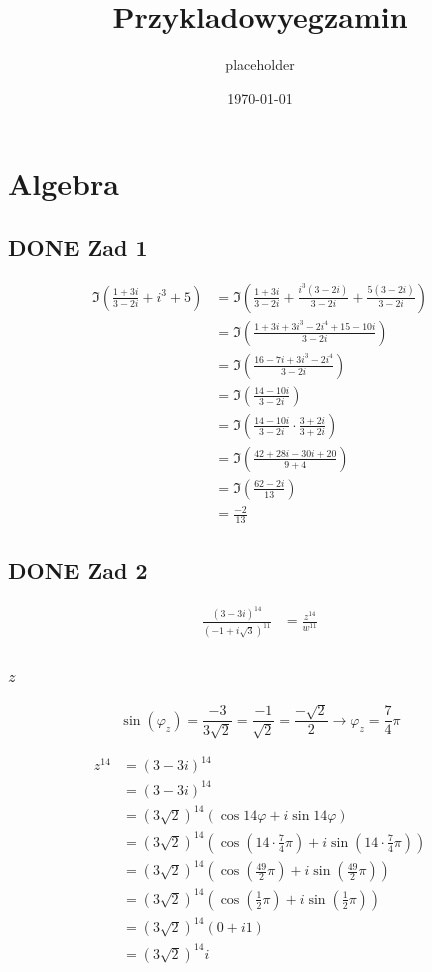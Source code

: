 \documentclass[11pt]{article}
\author{placeholder}
\date{\today}
\title{Przykladowyegzamin}
\begin{document}
\maketitle
\tableofcontents

\section{Algebra}
\label{sec:org32e7f5f}
\subsection{{\bfseries\sffamily DONE} Zad 1}
\label{sec:orgfd3b496}
\begin{align*}
\Im \left(\frac{1+3i}{3-2i} + i^{3} + 5\right)
 &=\Im \left(\frac{1+3i}{3-2i} + \frac{i^{3}(3-2i)}{3-2i} + \frac{5(3-2i)}{3-2i}\right)\\
 &= \Im \left(\frac{1+3i + 3i^3 - 2 i^4 + 15 - 10i}{3-2i}\right)\\
 &= \Im \left(\frac{16 - 7i + 3i^{3} -2i^{4}}{3-2i}\right)\\
 &= \Im \left(\frac{14 - 10i}{3-2i}\right)\\
 &= \Im \left(\frac{14 - 10i}{3-2i} \cdot \frac{3+2i}{3+2i}\right)\\
 &= \Im \left(\frac{42 + 28i - 30i + 20}{9 + 4}\right)\\
 &= \Im \left(\frac{62 - 2i }{13}\right)\\
 &= \frac{-2}{13}
\end{align*}
\subsection{{\bfseries\sffamily DONE} Zad 2}
\label{sec:org8cd91f0}
\begin{align*}
  \frac{ { (3 - 3i)}^{14} }
  { { (-1+i\sqrt{3}) }^{11} }
  &= \frac{z^{14}}{w^{11}}
\end{align*}
\subsubsection{\(z\)}
\label{sec:orgcd4e9f6}
$$\sin(\varphi_z) = \frac{-3}{3\sqrt{2}}
 = \frac{-1}{\sqrt{2}}
 = \frac{-\sqrt{2}}{2} \to \varphi_z = \frac{7}{4}\pi$$

\begin{align*}
  z^{14} &= {(3 - 3i)}^{14}\\
  &= {(3-3i)}^{14}\\
  &= {(3\sqrt{2})}^{14}(\cos 14 \varphi + i \sin 14 \varphi)\\
  &= {(3\sqrt{2})}^{14} \left(\cos \left(14 \cdot \frac{7}{4} \pi \right) + i \sin \left(14 \cdot \frac{7}{4} \pi \right) \right)\\
  &= {(3\sqrt{2})}^{14} \left( \cos \left ( \frac{49}{2} \pi \right) + i \sin \left(\frac{49}{2} \pi \right) \right)\\
  &= {(3\sqrt{2})}^{14} \left( \cos \left ( \frac{1}{2} \pi \right) + i \sin \left(\frac{1}{2} \pi \right) \right)\\
  &= {(3\sqrt{2})}^{14} ( 0 + i 1 )\\
  &= {(3\sqrt{2})}^{14}i
\end{align*}
\end{document}
